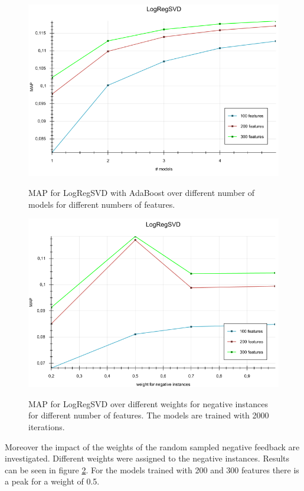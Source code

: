 \documentclass[10pt]{reportMaster}
\begin{document}
\begin{figure}
	\caption{MAP for LogRegSVD with AdaBoost over different number of models for different numbers of features.}
	\centering
	\includegraphics[width=1\textwidth]{figures/experiments/LogRegSVDModels}
	\label{fig:LogRegSVDModels}
\end{figure}


\begin{figure}
	\caption{MAP for LogRegSVD over different weights for negative instances for different number of features. The models are trained with 2000 iterations.}
	\centering
	\includegraphics[width=1\textwidth]{figures/experiments/LogRegSVDWeights}
	\label{fig:LogRegSVDWeights}
\end{figure}
Moreover the impact of the weights of the random sampled negative feedback are investigated.
Different weights were assigned to the negative instances.
Results can be seen in figure \ref{fig:LogRegSVDWeights}.
For the models trained with 200 and 300 features there is a peak for a weight of 0.5.
\end{document}
